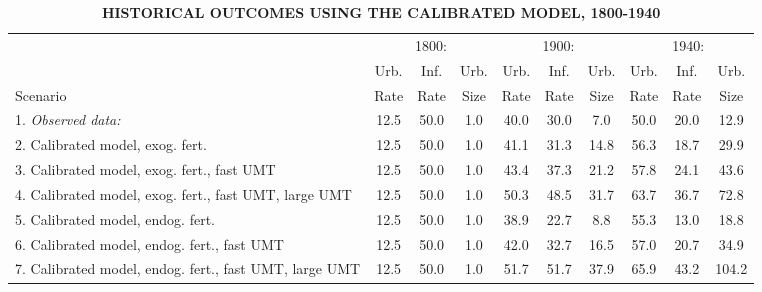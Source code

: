 
\begin{table}[htb]
\begin{center}
\begin{footnotesize}
\caption{\textbf{HISTORICAL OUTCOMES USING THE CALIBRATED MODEL, 1800-1940}} \label{tab_longrun}
\begin{tabular}{lccccccccc}
\midrule
         & \multicolumn{3}{c}{1800:} & \multicolumn{3}{c}{1900:} & \multicolumn{3}{c}{1940:} \\ \cmidrule(lr){2-4} \cmidrule(lr){5-7} \cmidrule(lr){8-10}
         & Urb. & Inf. & Urb. & Urb. & Inf. & Urb. & Urb. & Inf. & Urb. \\
Scenario & Rate & Rate & Size & Rate & Rate & Size & Rate & Rate & Size  \\ \midrule
1. \emph{Observed data:} & 12.5 & 50.0 & 1.0 & 40.0 & 30.0 & 7.0 & 50.0 & 20.0 & 12.9 \\ 
2. Calibrated model, exog. fert. &      12.5 &      50.0 & 1.0 &      41.1 &      31.3 &      14.8 &      56.3 &      18.7 &      29.9 \\ 
3. Calibrated model, exog. fert., fast UMT &      12.5 &      50.0 & 1.0 &      43.4 &      37.3 &      21.2 &      57.8 &      24.1 &      43.6 \\ 
4. Calibrated model, exog. fert., fast UMT, large UMT &      12.5 &      50.0 & 1.0 &      50.3 &      48.5 &      31.7 &      63.7 &      36.7 &      72.8 \\ 
5. Calibrated model, endog. fert. &      12.5 &      50.0 & 1.0 &      38.9 &      22.7 &       8.8 &      55.3 &      13.0 &      18.8 \\ 
6. Calibrated model, endog. fert., fast UMT &      12.5 &      50.0 & 1.0 &      42.0 &      32.7 &      16.5 &      57.0 &      20.7 &      34.9 \\ 
7. Calibrated model, endog. fert., fast UMT, large UMT &      12.5 &      50.0 & 1.0 &      51.7 &      51.7 &      37.9 &      65.9 &      43.2 &     104.2 \\ 
\midrule
\end{tabular}
\end{footnotesize}
\end{center}
\end{table}